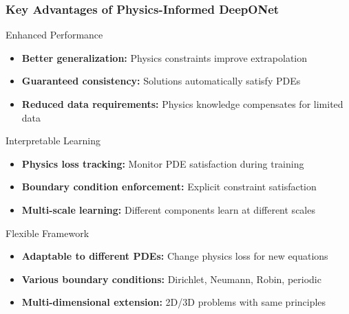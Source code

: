 \documentclass[notes]{beamer}
\begin{document}
\begin{frame}
\frametitle{Key Advantages of Physics-Informed DeepONet}

\begin{block}{Enhanced Performance}
\begin{itemize}
    \item \textbf{Better generalization:} Physics constraints improve extrapolation
    \item \textbf{Guaranteed consistency:} Solutions automatically satisfy PDEs
    \item \textbf{Reduced data requirements:} Physics knowledge compensates for limited data
\end{itemize}
\end{block}

\begin{block}{Interpretable Learning}
\begin{itemize}
    \item \textbf{Physics loss tracking:} Monitor PDE satisfaction during training
    \item \textbf{Boundary condition enforcement:} Explicit constraint satisfaction
    \item \textbf{Multi-scale learning:} Different components learn at different scales
\end{itemize}
\end{block}

\begin{block}{Flexible Framework}
\begin{itemize}
    \item \textbf{Adaptable to different PDEs:} Change physics loss for new equations
    \item \textbf{Various boundary conditions:} Dirichlet, Neumann, Robin, periodic
    \item \textbf{Multi-dimensional extension:} 2D/3D problems with same principles
\end{itemize}
\end{block}

\end{frame}
\end{document}
